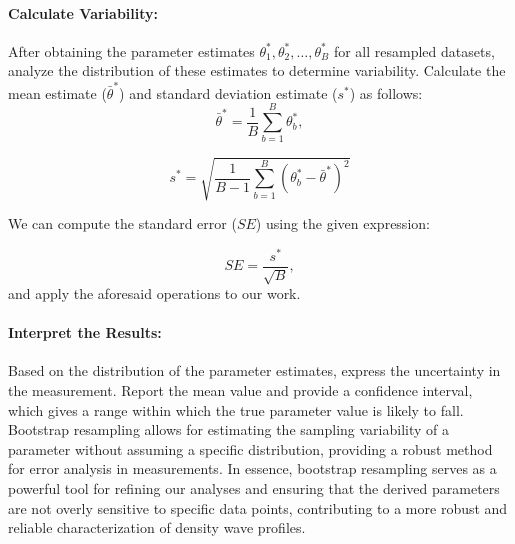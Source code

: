 \documentclass{article}
\begin{document}
\paragraph{Calculate Variability:}
After obtaining the parameter estimates $\theta^{*}_{1}, \theta^{*}_{2}, \ldots, \theta^{*}_{B}$ for all resampled datasets, analyze the distribution of these estimates to determine variability. Calculate the mean estimate ($\bar{\theta}^{*}$) and standard deviation estimate ($s^{*}$) as follows\cite{Chernick2007BootstrapMA}\cite{Efron1994AnIT}:
\begin{equation}
\bar{\theta}^{*} = \frac{1}{B}\sum_{b=1}^{B}\theta^{*}_{b},
\end{equation}

\begin{equation}
s^{*} = \sqrt{\frac{1}{B-1}\sum_{b=1}^{B}(\theta^{*}_{b} - \bar{\theta}^{*})^2}
\end{equation}

We can compute the standard error ($SE$) using the given expression\cite{Chernick2007BootstrapMA}\cite{davison_hinkley_1997}\cite{Efron1994AnIT}:

\begin{equation}
SE = \frac{s^{*}}{\sqrt{B}},
\end{equation}
and apply the aforesaid operations to our work.



\paragraph{Interpret the Results:}
Based on the distribution of the parameter estimates, express the uncertainty in the measurement. Report the mean value and provide a confidence interval, which gives a range within which the true parameter value is likely to fall. Bootstrap resampling allows for estimating the sampling variability of a parameter without assuming a specific distribution, providing a robust method for error analysis in measurements. In essence, bootstrap resampling serves as a powerful tool for refining our analyses and ensuring that the derived parameters are not overly sensitive to specific data points, contributing to a more robust and reliable characterization of density wave profiles.
\end{document}
